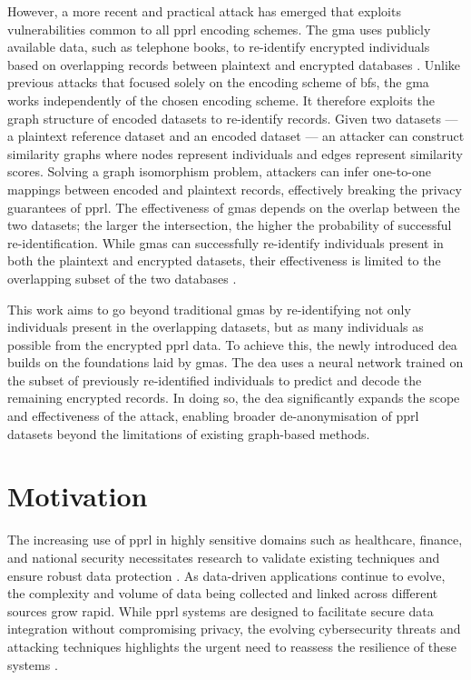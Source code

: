 However, a more recent and practical attack has emerged that exploits vulnerabilities common to all \ac{pprl} encoding schemes. 
The \ac{gma} uses publicly available data, such as telephone books, to re-identify encrypted individuals based on overlapping records between plaintext and encrypted databases \cite{vidanage2020graph, schaefer2024}. 
Unlike previous attacks that focused solely on the encoding scheme of \ac{bf}s, the \ac{gma} works independently of the chosen encoding scheme.
It therefore exploits the graph structure of encoded datasets to re-identify records. Given two datasets — a plaintext reference dataset and an encoded dataset — an attacker can construct similarity graphs where nodes represent individuals and edges represent similarity scores. 
Solving a graph isomorphism problem, attackers can infer one-to-one mappings between encoded and plaintext records, effectively breaking the privacy guarantees of \ac{pprl}. 
The effectiveness of \ac{gma}s depends on the overlap between the two datasets; the larger the intersection, the higher the probability of successful re-identification. 
While \ac{gma}s can successfully re-identify individuals present in both the plaintext and encrypted datasets, their effectiveness is limited to the overlapping subset of the two databases \cite{schaefer2024,vidanage2020graph}.

This work aims to go beyond traditional \ac{gma}s by re-identifying not only individuals present in the overlapping datasets, but as many individuals as possible from the encrypted \ac{pprl} data. 
To achieve this, the newly introduced \ac{dea} builds on the foundations laid by \ac{gma}s. 
The \ac{dea} uses a neural network trained on the subset of previously re-identified individuals to predict and decode the remaining encrypted records. 
In doing so, the \ac{dea} significantly expands the scope and effectiveness of the attack, enabling broader de-anonymisation of \ac{pprl} datasets beyond the limitations of existing graph-based methods.

\section{Motivation} \label{sec:motivation}

The increasing use of \ac{pprl} in highly sensitive domains such as healthcare, finance, and national security necessitates research to validate existing techniques and ensure robust data protection \cite{schnell2009privacy}. 
As data-driven applications continue to evolve, the complexity and volume of data being collected and linked across different sources grow rapid. 
While \ac{pprl} systems are designed to facilitate secure data integration without compromising privacy, the evolving cybersecurity threats and attacking techniques highlights the urgent need to reassess the resilience of these systems \cite{vatsalan2017privacy}.

